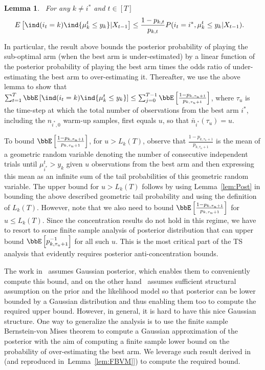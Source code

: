 \documentclass[11pt]{article}
\newtheorem{lemma}[theorem]{Lemma}
\begin{document}
        \begin{lemma}~\label{lem:Int1}
            For any $k\neq i^*$ and $t\in[T]$
            \begin{align}
                E&\left[  \ind(i_t=k )  \ind\{\mu_k^t \leq y_k  \} |X_{t-1}  \right] 
                \leq \frac{1-p_{k,t}}{p_{k,t}} P(i_t=i^* , \mu_k^t \leq y_k | X_{t-1} ).
            \end{align}
        \end{lemma}

In particular, the result above bounds the posterior probability of playing the sub-optimal arm (when the best arm is under-estimated) by a linear function of the posterior probability of playing the best arm times the odds ratio of under-estimating the best arm to over-estimating it. 
    Thereafter, we use the above lemma to show that $\sum_{t=1}^{T} \bbE \left[   \ind(i_t=k )  \ind\{\mu_k^t \leq y_k  \}   \right] \leq \sum_{j=0}^{T-1}  \bbE \left[   \frac{1-p_{k,\tau_{u}+1}}{p_{k,\tau_{u}+1}}     \right]$, where
    $\tau_{u}$ is the time-step at which the total number of observations from the best arm $i^*$, including the $n_{i^*,0}$ warm-up samples, first equals $u$, so that $\bar n_{i^*}(\tau_u) = u$. 
    
To bound $  \bbE \left[   \frac{1-p_{k,\tau_{u}+1}}{p_{k,\tau_{u}+1}}     \right]$, for $u>L_k(T)$, observe that $\frac{1-p_{k,\tau_{u}+1}}{p_{k,\tau_{u}+1}}$ is the mean of a geometric random variable denoting the number of consecutive independent trials until $\mu_{i^*}^t > y_k$ given $u$ observations from the best arm and then expressing this mean as an infinite sum of the tail probabilities of this geometric random variable.  The upper bound for $u>L_k(T)$ follows by using Lemma~\ref{lem:Post} in bounding the above described geometric tail probability and using the definition of $L_k(T)$. However, note that we also need to bound $ \bbE \left[ \frac{1-p_{k,\tau_{u}+1}}{p_{k,\tau_{u}+1}}     \right]$ for $u\leq L_k(T)$. Since the concentration results do not hold in this regime, we have to resort to some finite sample analysis of posterior distribution that can upper bound $\bbE \left[   p_{k,\tau_{u}+1}^{-1}    \right]$ for all such $u$. This is the most critical part of the TS analysis that evidently requires posterior anti-concentration bounds.
    
The work in~\cite{agrawal2013further} assumes Gaussian posterior, which enables them to conveniently compute this bound, and on the other hand~\cite{mazumdar20a} assumes sufficient structural assumption on the prior and the likelihood model so that posterior can be lower bounded by a Gaussian distribution and thus enabling them too to compute the required upper bound. However, in general, it is hard to have this nice Gaussian structure. One way to generalize the analysis is to use the finite sample Bernstein-von Mises theorem to compute a Gaussian approximation of the posterior with the aim of computing a finite sample lower bound on the probability of over-estimating the best arm. We leverage such result derived in~\cite{Spokoiny2012,Panov2015} (and reproduced in~Lemma~\ref{lem:FBVM}]) to compute the required bound.
\end{document}
